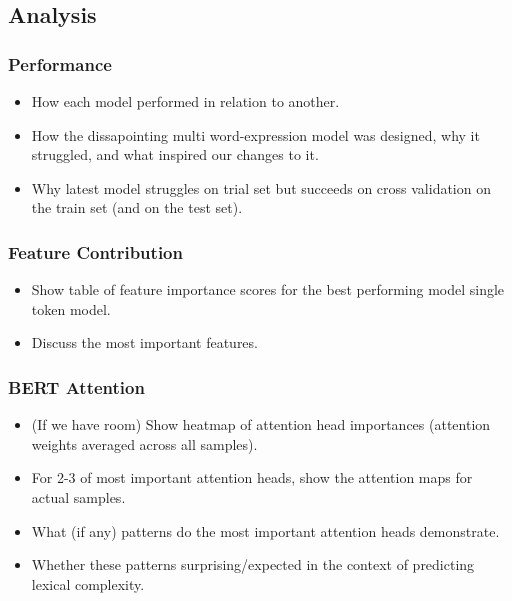 \documentclass[11pt,a4paper]{article}
\begin{document}
\subsection{Analysis}

\subsubsection{Performance}

\begin{itemize}
  \item How each model performed in relation to another.
  \item How the dissapointing multi word-expression model was designed, why it struggled, and what inspired our changes to it.
  \item Why latest model struggles on trial set but succeeds on cross validation on the train set (and on the test set).
\end{itemize}

\subsubsection{Feature Contribution}

\begin{itemize}
  \item Show table of feature importance scores for the best performing model single token model.
  \item Discuss the most important features.
\end{itemize}

\subsubsection{BERT Attention}

\begin{itemize}
  \item (If we have room) Show heatmap of attention head importances (attention weights averaged across all samples).
  \item For 2-3 of most important attention heads, show the attention maps for actual samples.
  \item What (if any) patterns do the most important attention heads demonstrate.
  \item Whether these patterns surprising/expected in the context of predicting lexical complexity.
\end{itemize}
\end{document}
